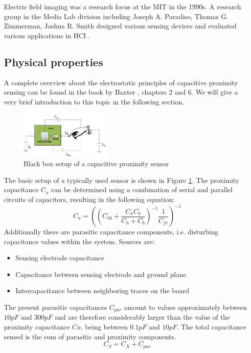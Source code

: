 Electric field imaging was a research focus at the MIT in the 1990s. A research group in the Media Lab division including Joseph A. Paradiso, Thomas G. Zimmerman, Joshua R. Smith designed various sensing devices and evaluated various applications in HCI \cite{Zimmerman1995}\cite{Smith1999a}.
\subsection{Physical properties}
A complete overview about the electrostatic principles of capacitive proximity sensing can be found in the book by Baxter \cite{Baxter1996}, chapters 2 and 6. We will give a very brief introduction to this topic in the following section.
\begin{figure}[h]
\centering
\includegraphics[width=0.4\textwidth]{images/cap_blackbox.png}
\caption{Black box setup of a capacitive proximity sensor}
\label{fig:cap_blackbox}
\end{figure}
The basic setup of a typically used sensor is shown in Figure \ref{fig:cap_blackbox}. The proximity capacitance \(C_{x}\) can be determined using a combination of serial and parallel circuits of capacitors, resulting in the following equation:
\begin{equation}
C_{x}=\left(\left(C_{hb}+\frac{C_{h}C_{b}}{C_{h}+C_{b}}\right)^{-1}\frac{1}{C_{fe}}\right)^{-1}
\end{equation}
Additionally there are parasitic capacitance components, i.e. disturbing capacitance values within the system. Sources are:
\begin{itemize}
\item Sensing electrode capacitance
\item Capacitance between sensing electrode and ground plane
\item Intercapacitance between neighboring traces on the board
\end{itemize}
The present parasitic capacitances \(C_{par}\) amount to values approximately between \(10pF\) and \(300pF\) and are therefore considerably larger than the value of the proximity capacitance \(Cx\), being between \(0.1pF\) and \(10pF\). The total capacitance sensed is the sum of parasitic and proximity components. 
\begin{equation}
C_{S}=C_{X}+C_{par}
\end{equation}

